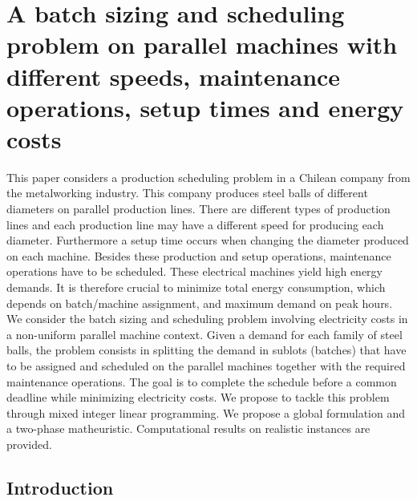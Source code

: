 \chapter{A batch sizing and scheduling problem on parallel machines with
different speeds, maintenance operations, setup times and energy
costs}
\label{ann:IESM}

This paper considers a production scheduling problem in a Chilean
company from the metalworking industry. This company produces steel
balls of different diameters on parallel production lines. There are
different types of production lines and each production line may have a
different speed for producing each diameter. Furthermore a setup time
occurs when changing the diameter produced on each machine. Besides
these production and setup operations, maintenance operations have to
be scheduled. These electrical machines yield high energy
demands. It is therefore crucial to minimize total energy consumption,
which depends on batch/machine assignment, and maximum demand on peak
hours. We consider the batch sizing and scheduling problem involving
electricity costs in a non-uniform parallel machine context. Given a
demand for each family of steel balls, the problem consists in
splitting the demand in sublots (batches) that have to be assigned and
scheduled on the parallel machines together with the required
maintenance operations. The goal is to complete the schedule before a
common deadline while minimizing electricity costs. We propose to
tackle this problem through mixed integer linear programming. We
propose a global formulation and a two-phase
matheuristic. Computational results on realistic instances are
provided.

\section{Introduction}

